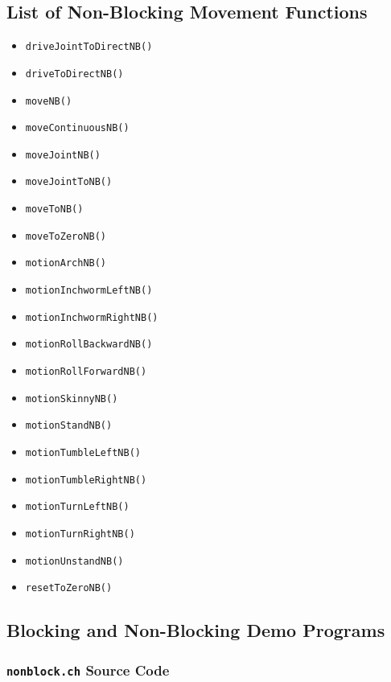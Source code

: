 \documentclass{article}
\begin{document}
\subsection{List of Non-Blocking Movement Functions}
\begin{itemize}
\item \texttt{driveJointToDirectNB()}
\item \texttt{driveToDirectNB()}
\item \texttt{moveNB()}
\item \texttt{moveContinuousNB()}
\item \texttt{moveJointNB()}
\item \texttt{moveJointToNB()}
\item \texttt{moveToNB()}
\item \texttt{moveToZeroNB()}
\item \texttt{motionArchNB()}
\item \texttt{motionInchwormLeftNB()}
\item \texttt{motionInchwormRightNB()}
\item \texttt{motionRollBackwardNB()}
\item \texttt{motionRollForwardNB()}
\item \texttt{motionSkinnyNB()}
\item \texttt{motionStandNB()}
\item \texttt{motionTumbleLeftNB()}
\item \texttt{motionTumbleRightNB()}
\item \texttt{motionTurnLeftNB()}
\item \texttt{motionTurnRightNB()}
\item \texttt{motionUnstandNB()}
\item \texttt{resetToZeroNB()}
\end{itemize}

\subsection{Blocking and Non-Blocking Demo Programs}
\subsubsection{\texttt{nonblock.ch} Source Code}

\end{document}
